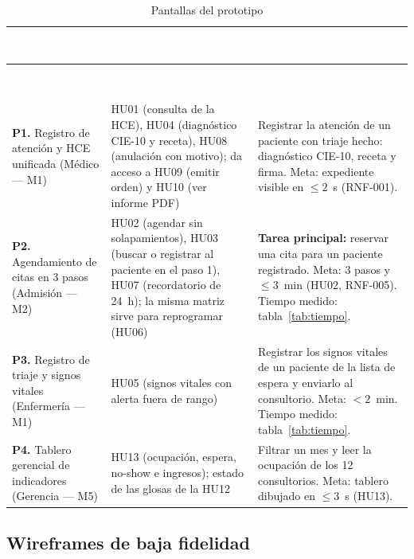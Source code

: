 \documentclass[11pt,a4paper]{article}
\newcommand{\cab}[1]{\textcolor{white}{\textbf{#1}}}
\begin{document}
\begin{xltabular}{\linewidth}{|P{4cm}|L|L|}
  \caption{Pantallas del prototipo}\label{tab:pantallas}\\
  \hline
  \cab{Pantalla} & \cab{Historia de usuario que atiende} & \cab{Tarea principal y tiempo medido} \\ \hline
  \endfirsthead
  \hline
  \cab{Pantalla} & \cab{Historia de usuario que atiende} & \cab{Tarea principal y tiempo medido} \\ \hline
  \endhead
  \textbf{P1.} Registro de atención y HCE unificada \newline (Médico --- M1) &
    HU01 (consulta de la HCE), HU04 (diagnóstico CIE-10 y receta), HU08 (anulación con motivo);
    da acceso a HU09 (emitir orden) y HU10 (ver informe PDF) &
    Registrar la atención de un paciente con triaje hecho: diagnóstico CIE-10, receta y firma.
    Meta: expediente visible en $\leq 2$~s (RNF-001). \\ \hline
  \textbf{P2.} Agendamiento de citas en 3 pasos \newline (Admisión --- M2) &
    HU02 (agendar sin solapamientos), HU03 (buscar o registrar al paciente en el paso 1),
    HU07 (recordatorio de 24~h); la misma matriz sirve para reprogramar (HU06) &
    \textbf{Tarea principal:} reservar una cita para un paciente registrado. Meta: 3 pasos y
    $\leq 3$~min (HU02, RNF-005). Tiempo medido: tabla~\ref{tab:tiempo}. \\ \hline
  \textbf{P3.} Registro de triaje y signos vitales \newline (Enfermería --- M1) &
    HU05 (signos vitales con alerta fuera de rango) &
    Registrar los signos vitales de un paciente de la lista de espera y enviarlo al consultorio.
    Meta: $< 2$~min. Tiempo medido: tabla~\ref{tab:tiempo}. \\ \hline
  \textbf{P4.} Tablero gerencial de indicadores \newline (Gerencia --- M5) &
    HU13 (ocupación, espera, no-show e ingresos); estado de las glosas de la HU12 &
    Filtrar un mes y leer la ocupación de los 12 consultorios. Meta: tablero dibujado en
    $\leq 3$~s (HU13). \\ \hline
\end{xltabular}

\subsection{Wireframes de baja fidelidad}
\end{document}
